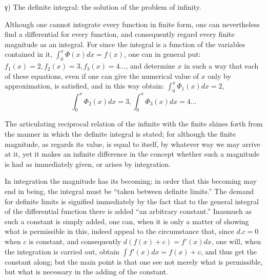 \documentclass[12pt,a4paper,openany]{book}
\newcommand{\opage}[1]{\marginnote{\footnotesize\textit{[#1]}}}
\begin{document}
\begin{center}γ) The definite integral: the solution of the problem of infinity.\end{center}

Although one cannot integrate every function
in finite form, one can nevertheless find a differential for every function,
and consequently regard every finite magnitude
as an integral. For since the integral is a function of
the variables contained in it, $\int_{0}^{x}\Phi(x)dx=f(x)$, one can in general
put: $f_{1}(x)=2, f_{2}(x)=3, f_{3}(x)=4\ldots$, and
determine $x$ in such a way that each of these equations, even if
one can give the numerical value of $x$ only by approximation, is
satisfied, and in this way obtain: $\int_{0}^{x}\Phi_{1}(x)dx=2$,
\[ \int_{0}^{x}\Phi_{2}(x)dx=3, \int_{0}^{x}\Phi_{3}(x)dx=4\ldots \]

The articulating reciprocal relation of the infinite with the finite
shines forth from the manner in which the definite integral
is stated; for although the finite magnitude, as regards its value,
is equal to itself, by whatever way we may arrive at
it, yet it makes an infinite difference in the concept whether
such a magnitude is had as immediately given, or
arises by integration.

In integration the magnitude has its becoming; in order that
this becoming may end in being, the integral must
be ``taken between definite limits.'' The demand for definite limits is signified immediately by the fact that to
the general integral of the differential function there is added ``an arbitrary
constant.'' Inasmuch as such a constant is
\setcounter{footnote}{0}%
\opage{112}simply added, one can, when it is only a matter of showing
what is permissible in this, indeed appeal to the circumstance
that, since $d.c=0$ when $c$ is constant, and
consequently $d(f(x)+c)=f'(x)dx$, one will, when the integration
is carried out, obtain $\int f'(x)dx=f(x)+c$, and thus
get the constant along; but the main point is that one see
not merely what is permissible, but what is necessary in
the adding of the constant.
\end{document}
